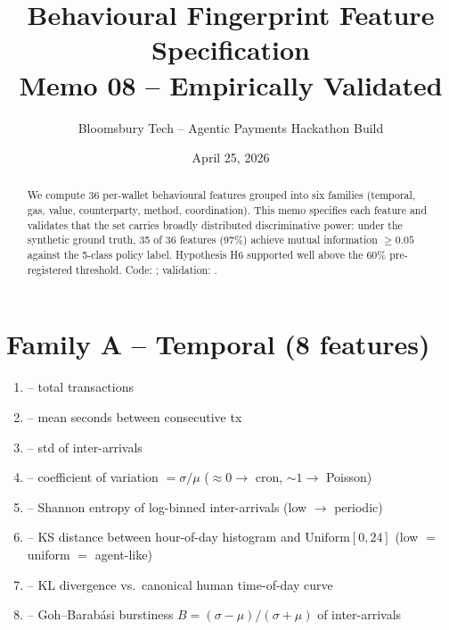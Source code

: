 \documentclass[11pt]{article}
\title{\textbf{Behavioural Fingerprint Feature Specification}\\
\large Memo 08 -- Empirically Validated}
\author{Bloomsbury Tech -- Agentic Payments Hackathon Build}
\date{April 25, 2026}
\begin{document}
\maketitle

\begin{abstract}
We compute 36 per-wallet behavioural features grouped into six families
(temporal, gas, value, counterparty, method, coordination). This memo
specifies each feature and validates that the set carries broadly distributed
discriminative power: under the synthetic ground truth, 35 of 36 features
(97\%) achieve mutual information $\geq 0.05$ against the 5-class policy
label. Hypothesis H6 supported well above the 60\% pre-registered threshold.
Code: ; validation:
.
\end{abstract}

\section{Family A -- Temporal (8 features)}
\begin{enumerate}
  \item {} -- total transactions
  \item {} -- mean seconds between consecutive tx
  \item {} -- std of inter-arrivals
  \item {} -- coefficient of variation $=\sigma/\mu$
    ($\approx 0 \to$ cron, $\sim 1 \to$ Poisson)
  \item {} -- Shannon entropy of log-binned
    inter-arrivals (low $\to$ periodic)
  \item {} -- KS distance between hour-of-day
    histogram and $\mathrm{Uniform}[0,24]$ (low $=$ uniform $=$ agent-like)
  \item {} -- KL divergence vs.\ canonical human
    time-of-day curve
  \item {} -- Goh--Barab\'{a}si burstiness
    $B=(\sigma-\mu)/(\sigma+\mu)$ of inter-arrivals
\end{enumerate}
\end{document}
